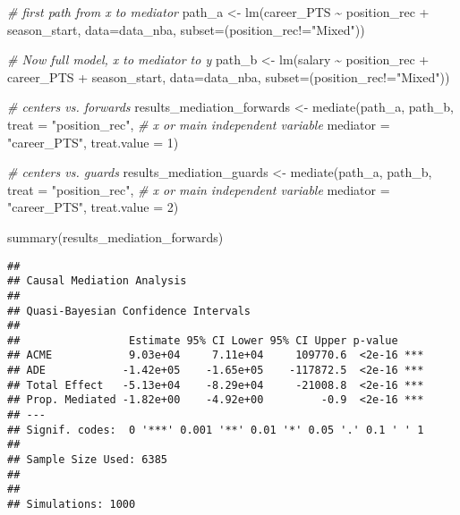 \documentclass[
]{book}
\newenvironment{Shaded}{\begin{snugshade}}{\end{snugshade}}
\newcommand{\AttributeTok}[1]{\textcolor[rgb]{0.77,0.63,0.00}{#1}}
\newcommand{\AttributeTok}[1]{\textcolor[rgb]{0.13,0.29,0.53}{#1}}
\newcommand{\CommentTok}[1]{\textcolor[rgb]{0.56,0.35,0.01}{\textit{#1}}}
\newcommand{\DecValTok}[1]{\textcolor[rgb]{0.00,0.00,0.81}{#1}}
\newcommand{\FunctionTok}[1]{\textcolor[rgb]{0.00,0.00,0.00}{#1}}
\newcommand{\FunctionTok}[1]{\textcolor[rgb]{0.13,0.29,0.53}{\textbf{#1}}}
\newcommand{\NormalTok}[1]{#1}
\newcommand{\OtherTok}[1]{\textcolor[rgb]{0.56,0.35,0.01}{#1}}
\newcommand{\SpecialCharTok}[1]{\textcolor[rgb]{0.00,0.00,0.00}{#1}}
\newcommand{\SpecialCharTok}[1]{\textcolor[rgb]{0.81,0.36,0.00}{\textbf{#1}}}
\newcommand{\StringTok}[1]{\textcolor[rgb]{0.31,0.60,0.02}{#1}}
\begin{document}
\begin{Shaded}
\begin{Highlighting}[]
\CommentTok{\# first path from x to mediator}
\NormalTok{path\_a }\OtherTok{\textless{}{-}} \FunctionTok{lm}\NormalTok{(career\_PTS }\SpecialCharTok{\textasciitilde{}}\NormalTok{ position\_rec }\SpecialCharTok{+}\NormalTok{ season\_start, }\AttributeTok{data=}\NormalTok{data\_nba, }\AttributeTok{subset=}\NormalTok{(position\_rec}\SpecialCharTok{!=}\StringTok{"Mixed"}\NormalTok{))}

\CommentTok{\# Now full model, x to mediator to y}
\NormalTok{path\_b }\OtherTok{\textless{}{-}} \FunctionTok{lm}\NormalTok{(salary }\SpecialCharTok{\textasciitilde{}}\NormalTok{ position\_rec }\SpecialCharTok{+}\NormalTok{ career\_PTS }\SpecialCharTok{+}\NormalTok{ season\_start, }\AttributeTok{data=}\NormalTok{data\_nba, }\AttributeTok{subset=}\NormalTok{(position\_rec}\SpecialCharTok{!=}\StringTok{"Mixed"}\NormalTok{))}

\CommentTok{\# centers vs. forwards}
\NormalTok{results\_mediation\_forwards }\OtherTok{\textless{}{-}} \FunctionTok{mediate}\NormalTok{(path\_a, path\_b,}
                             \AttributeTok{treat =} \StringTok{"position\_rec"}\NormalTok{, }\CommentTok{\# x or main independent variable}
                             \AttributeTok{mediator =} \StringTok{"career\_PTS"}\NormalTok{,}
                             \AttributeTok{treat.value =} \DecValTok{1}\NormalTok{)}

\CommentTok{\# centers vs. guards}
\NormalTok{results\_mediation\_guards }\OtherTok{\textless{}{-}} \FunctionTok{mediate}\NormalTok{(path\_a, path\_b,}
                             \AttributeTok{treat =} \StringTok{"position\_rec"}\NormalTok{, }\CommentTok{\# x or main independent variable}
                             \AttributeTok{mediator =} \StringTok{"career\_PTS"}\NormalTok{,}
                             \AttributeTok{treat.value =} \DecValTok{2}\NormalTok{)}

\FunctionTok{summary}\NormalTok{(results\_mediation\_forwards)}
\end{Highlighting}
\end{Shaded}

\begin{verbatim}
## 
## Causal Mediation Analysis 
## 
## Quasi-Bayesian Confidence Intervals
## 
##                 Estimate 95% CI Lower 95% CI Upper p-value    
## ACME            9.03e+04     7.11e+04     109770.6  <2e-16 ***
## ADE            -1.42e+05    -1.65e+05    -117872.5  <2e-16 ***
## Total Effect   -5.13e+04    -8.29e+04     -21008.8  <2e-16 ***
## Prop. Mediated -1.82e+00    -4.92e+00         -0.9  <2e-16 ***
## ---
## Signif. codes:  0 '***' 0.001 '**' 0.01 '*' 0.05 '.' 0.1 ' ' 1
## 
## Sample Size Used: 6385 
## 
## 
## Simulations: 1000
\end{verbatim}
\end{document}
